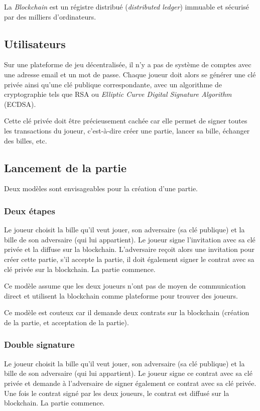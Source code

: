 \documentclass{article}
\begin{document}
La \textit{Blockchain} est un régistre distribué (\textit{distributed ledger}) immuable et sécurisé par des milliers d'ordinateurs.

\subsection{Utilisateurs}
Sur une plateforme de jeu décentralisée, il n'y a pas de système de comptes avec une adresse email et un mot de passe.
Chaque joueur doit alors se générer une clé privée ainsi qu'une clé publique correspondante, avec un algorithme de cryptographie tels que RSA ou \textit{Elliptic Curve Digital Signature Algorithm} (ECDSA).

Cette clé privée doit être précieusement cachée car elle permet de signer toutes les transactions du joueur, c'est-à-dire créer une partie, lancer sa bille, échanger des billes, etc.

\subsection{Lancement de la partie}
Deux modèles sont envisageables pour la création d'une partie.
\subsubsection{Deux étapes}
Le joueur choisit la bille qu'il veut jouer, son adversaire (sa clé publique) et la bille de son adversaire (qui lui appartient). Le joueur signe l'invitation avec sa clé privée et la diffuse sur la blockchain. L'adversaire reçoit alors une invitation pour créer cette partie, s'il accepte la partie, il doit également signer le contrat avec sa clé privée sur la blockchain. La partie commence.

Ce modèle assume que les deux joueurs n'ont pas de moyen de communication direct et utilisent la blockchain comme plateforme pour trouver des joueurs.

Ce modèle est couteux car il demande deux contrats sur la blockchain (création de la partie, et acceptation de la partie).


\subsubsection{Double signature}
Le joueur choisit la bille qu'il veut jouer, son adversaire (sa clé publique) et la bille de son adversaire (qui lui appartient). Le joueur signe ce contrat avec sa clé privée et demande à l'adversaire de signer également ce contrat avec sa clé privée. Une fois le contrat signé par les deux joueurs, le contrat est diffusé sur la blockchain. La partie commence.
\end{document}
